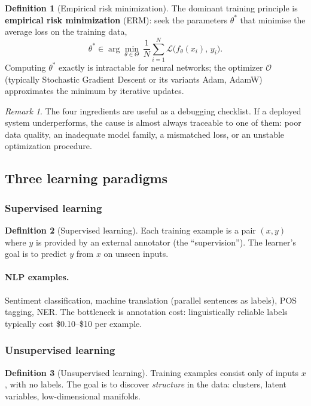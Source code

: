\documentclass[12pt,a4paper]{report}
\theoremstyle{definition}
\newtheorem{definition}{Definition}[section]
\theoremstyle{remark}
\newtheorem{remark}{Remark}[section]
\begin{document}
\begin{definition}[Empirical risk minimization]
The dominant training principle is \textbf{empirical risk minimization} (ERM): seek the parameters $\theta^*$ that minimise the average loss on the training data,
\[ \theta^* \in \arg\min_{\theta \in \Theta}\, \frac{1}{N} \sum_{i=1}^{N} \mathcal{L}\big(f_\theta(x_i),\, y_i\big). \]
Computing $\theta^*$ exactly is intractable for neural networks; the optimizer $\mathcal{O}$ (typically Stochastic Gradient Descent or its variants Adam, AdamW) approximates the minimum by iterative updates.
\end{definition}

\begin{remark}
The four ingredients are useful as a debugging checklist. If a deployed system underperforms, the cause is almost always traceable to one of them: poor data quality, an inadequate model family, a mismatched loss, or an unstable optimization procedure.
\end{remark}

\subsection{Three learning paradigms}

\subsubsection*{Supervised learning}

\begin{definition}[Supervised learning]
Each training example is a pair $(x, y)$ where $y$ is provided by an external annotator (the ``supervision''). The learner's goal is to predict $y$ from $x$ on unseen inputs.
\end{definition}

\paragraph{NLP examples.} Sentiment classification, machine translation (parallel sentences as labels), POS tagging, NER. The bottleneck is annotation cost: linguistically reliable labels typically cost \$0.10--\$10 per example.

\subsubsection*{Unsupervised learning}

\begin{definition}[Unsupervised learning]
Training examples consist only of inputs $x$, with no labels. The goal is to discover \emph{structure} in the data: clusters, latent variables, low-dimensional manifolds.
\end{definition}
\end{document}

